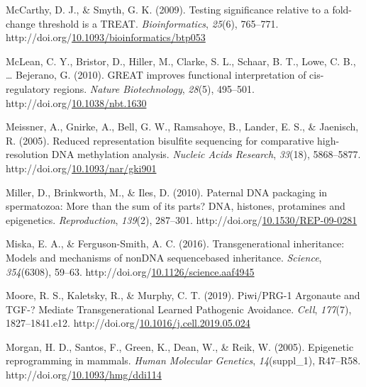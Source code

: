 \documentclass[12pt,twoside]{reedthesis}
\newlength{\cslhangindent}
\newenvironment{CSLReferences}[2] %
 {%
  \setlength{\parindent}{0pt}
  \ifodd #1 \everypar{\setlength{\hangindent}{\cslhangindent}}\ignorespaces\fi
  \ifnum #2 > 0
  \setlength{\parskip}{#2\baselineskip}
  \fi
 }%
 {}
\begin{document}
\begin{CSLReferences}{1}{0}
\leavevmode{}%
McCarthy, D. J., \& Smyth, G. K. (2009). Testing significance relative to a fold-change threshold is a TREAT. \emph{Bioinformatics}, \emph{25}(6), 765--771. http://doi.org/\href{https://doi.org/10.1093/bioinformatics/btp053}{10.1093/bioinformatics/btp053}

\leavevmode{}%
McLean, C. Y., Bristor, D., Hiller, M., Clarke, S. L., Schaar, B. T., Lowe, C. B., \ldots{} Bejerano, G. (2010). GREAT improves functional interpretation of cis-regulatory regions. \emph{Nature Biotechnology}, \emph{28}(5), 495--501. http://doi.org/\href{https://doi.org/10.1038/nbt.1630}{10.1038/nbt.1630}

\leavevmode{}%
Meissner, A., Gnirke, A., Bell, G. W., Ramsahoye, B., Lander, E. S., \& Jaenisch, R. (2005). Reduced representation bisulfite sequencing for comparative high-resolution DNA methylation analysis. \emph{Nucleic Acids Research}, \emph{33}(18), 5868--5877. http://doi.org/\href{https://doi.org/10.1093/nar/gki901}{10.1093/nar/gki901}

\leavevmode{}%
Miller, D., Brinkworth, M., \& Iles, D. (2010). Paternal DNA packaging in spermatozoa: More than the sum of its parts? DNA, histones, protamines and epigenetics. \emph{Reproduction}, \emph{139}(2), 287--301. http://doi.org/\href{https://doi.org/10.1530/REP-09-0281}{10.1530/REP-09-0281}

\leavevmode{}%
Miska, E. A., \& Ferguson-Smith, A. C. (2016). Transgenerational inheritance: Models and mechanisms of non{\textendash}DNA sequence{\textendash}based inheritance. \emph{Science}, \emph{354}(6308), 59--63. http://doi.org/\href{https://doi.org/10.1126/science.aaf4945}{10.1126/science.aaf4945}

\leavevmode{}%
Moore, R. S., Kaletsky, R., \& Murphy, C. T. (2019). Piwi/PRG-1 Argonaute and TGF-? Mediate Transgenerational Learned Pathogenic Avoidance. \emph{Cell}, \emph{177}(7), 1827--1841.e12. http://doi.org/\href{https://doi.org/10.1016/j.cell.2019.05.024}{10.1016/j.cell.2019.05.024}

\leavevmode{}%
Morgan, H. D., Santos, F., Green, K., Dean, W., \& Reik, W. (2005). Epigenetic reprogramming in mammals. \emph{Human Molecular Genetics}, \emph{14}(suppl{\_}1), R47--R58. http://doi.org/\href{https://doi.org/10.1093/hmg/ddi114}{10.1093/hmg/ddi114}


\end{CSLReferences}
\end{document}
